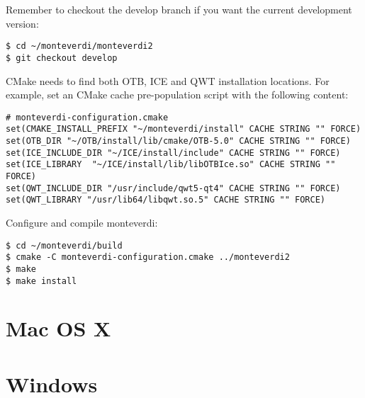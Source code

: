 Remember to checkout the develop branch if you want the current development version:
\begin{verbatim}
$ cd ~/monteverdi/monteverdi2
$ git checkout develop
\end{verbatim}

CMake needs to find both OTB, ICE and QWT installation locations.
For example, set an CMake cache pre-population script with the following content:
\begin{verbatim}
# monteverdi-configuration.cmake
set(CMAKE_INSTALL_PREFIX "~/monteverdi/install" CACHE STRING "" FORCE)
set(OTB_DIR "~/OTB/install/lib/cmake/OTB-5.0" CACHE STRING "" FORCE)
set(ICE_INCLUDE_DIR "~/ICE/install/include" CACHE STRING "" FORCE)
set(ICE_LIBRARY  "~/ICE/install/lib/libOTBIce.so" CACHE STRING "" FORCE)
set(QWT_INCLUDE_DIR "/usr/include/qwt5-qt4" CACHE STRING "" FORCE)
set(QWT_LIBRARY "/usr/lib64/libqwt.so.5" CACHE STRING "" FORCE)
\end{verbatim}

Configure and compile monteverdi:
\begin{verbatim}
$ cd ~/monteverdi/build
$ cmake -C monteverdi-configuration.cmake ../monteverdi2
$ make
$ make install
\end{verbatim}

\section{Mac OS X}
\section{Windows}
